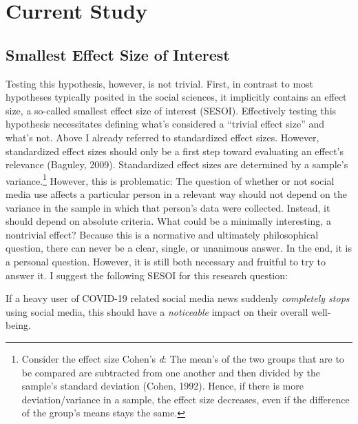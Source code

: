 \documentclass[
  english,
  man,mask,floatsintext]{apa6}
\begin{document}
\hypertarget{current-study}{%
\section{Current Study}\label{current-study}}

\hypertarget{smallest-effect-size-of-interest}{%
\subsection{Smallest Effect Size of Interest}\label{smallest-effect-size-of-interest}}

Testing this hypothesis, however, is not trivial.
First, in contrast to most hypotheses typically posited in the social sciences, it implicitly contains an effect size, a so-called smallest effect size of interest (SESOI).
Effectively testing this hypothesis necessitates defining what's considered a ``trivial effect size'' and what's not.
Above I already referred to standardized effect sizes.
However, standardized effect sizes should only be a first step toward evaluating an effect's relevance (Baguley, 2009).
Standardized effect sizes are determined by a sample's variance.\footnote{Consider the effect size Cohen's \emph{d}: The mean's of the two groups that are to be compared are subtracted from one another and then divided by the sample's standard deviation (Cohen, 1992). Hence, if there is more deviation/variance in a sample, the effect size decreases, even if the difference of the group's means stays the same.}
However, this is problematic: The question of whether or not social media use affects a particular person in a relevant way should not depend on the variance in the sample in which that person's data were collected.
Instead, it should depend on absolute criteria.
What could be a minimally interesting, a nontrivial effect?
Because this is a normative and ultimately philosophical question, there can never be a clear, single, or unanimous answer.
In the end, it is a personal question.
However, it is still both necessary and fruitful to try to answer it.
I suggest the following SESOI for this research question:

If a heavy user of COVID-19 related social media news suddenly \emph{completely stops} using social media, this should have a \emph{noticeable} impact on their overall well-being.
\end{document}
